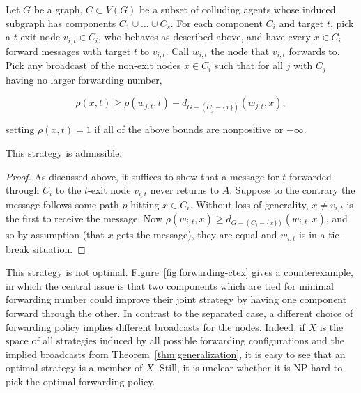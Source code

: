 \documentclass{comnet}
\begin{document}
\begin{theorem}\label{thm:generalization}

Let $G$ be a graph, $C \subset V(G)$ be a subset of colluding agents whose
induced subgraph has components $C_1 \cup \dots \cup C_s$. For each component
$C_i$ and target $t$, pick a $t$-exit node $v_{i,t} \in C_i$, who behaves as
described above, and have every $x \in C_i$ forward messages with target $t$ to
$v_{i,t}$. Call $w_{i,t}$ the node that $v_{i,t}$ forwards to. Pick any
broadcast of the non-exit nodes $x \in C_i$ such that for all $j$ with $C_j$
having no larger forwarding number,

\[ 
    \rho(x,t) \geq \rho(w_{j,t},t) - d_{G-(C_j - \{ x \} )}(w_{j,t}, x),
\]

setting $\rho(x,t) = 1$ if all of the above bounds are nonpositive or
$-\infty$. 

This strategy is admissible.

\end{theorem}

\begin{proof}

As discussed above, it suffices to show that a message for $t$ forwarded
through $C_i$ to the $t$-exit node $v_{i,t}$ never returns to $A$. Suppose to
the contrary the message follows some path $p$ hitting $x \in C_i$. Without
loss of generality, $x \neq v_{i,t}$ is the first to receive the message. Now
$\rho(w_{i,t}, x) \geq d_{G-(C_i - \{ x \})}(w_{i,t}, x)$, and so by assumption
(that $x$ gets the message), they are equal and $w_{i,t}$ is in a tie-break
situation.
\end{proof}

This strategy is not optimal. Figure~\ref{fig:forwarding-ctex} gives a
counterexample, in which the central issue is that two components which are
tied for minimal forwarding number could improve their joint strategy by having
one component forward through the other. In contrast to the separated case, a
different choice of forwarding policy implies different broadcasts for the
nodes. Indeed, if $X$ is the space of all strategies induced by all possible
forwarding configurations and the implied broadcasts from
Theorem~\ref{thm:generalization}, it is easy to see that an optimal strategy is
a member of $X$.  Still, it is unclear whether it is NP-hard to pick the
optimal forwarding policy.
\end{document}
